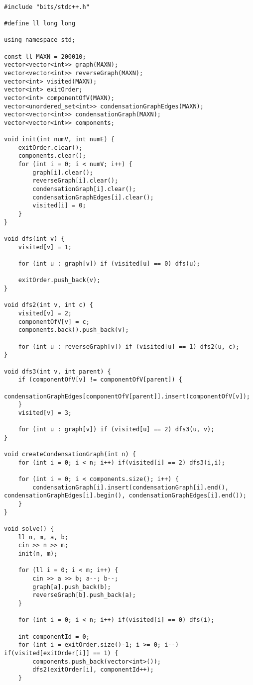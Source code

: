\documentclass[landscape,twocolumn,10pt,a4paper]{article}
\begin{document}
\begin{verbatim}

#include "bits/stdc++.h"

#define ll long long

using namespace std;

const ll MAXN = 200010;
vector<vector<int>> graph(MAXN);
vector<vector<int>> reverseGraph(MAXN);
vector<int> visited(MAXN);
vector<int> exitOrder;
vector<int> componentOfV(MAXN);
vector<unordered_set<int>> condensationGraphEdges(MAXN);
vector<vector<int>> condensationGraph(MAXN);
vector<vector<int>> components;

void init(int numV, int numE) {
    exitOrder.clear();
    components.clear();
    for (int i = 0; i < numV; i++) {
        graph[i].clear();
        reverseGraph[i].clear();
        condensationGraph[i].clear();
        condensationGraphEdges[i].clear();
        visited[i] = 0;
    }
}

void dfs(int v) {
    visited[v] = 1;

    for (int u : graph[v]) if (visited[u] == 0) dfs(u);

    exitOrder.push_back(v);
}

void dfs2(int v, int c) {
    visited[v] = 2;
    componentOfV[v] = c;
    components.back().push_back(v);

    for (int u : reverseGraph[v]) if (visited[u] == 1) dfs2(u, c);
}

void dfs3(int v, int parent) {
    if (componentOfV[v] != componentOfV[parent]) {
        condensationGraphEdges[componentOfV[parent]].insert(componentOfV[v]);
    }
    visited[v] = 3;

    for (int u : graph[v]) if (visited[u] == 2) dfs3(u, v);
}

void createCondensationGraph(int n) {
    for (int i = 0; i < n; i++) if(visited[i] == 2) dfs3(i,i);

    for (int i = 0; i < components.size(); i++) {
        condensationGraph[i].insert(condensationGraph[i].end(), condensationGraphEdges[i].begin(), condensationGraphEdges[i].end());
    }
}

void solve() {
    ll n, m, a, b;
    cin >> n >> m;
    init(n, m);

    for (ll i = 0; i < m; i++) {
        cin >> a >> b; a--; b--;
        graph[a].push_back(b);
        reverseGraph[b].push_back(a);
    }

    for (int i = 0; i < n; i++) if(visited[i] == 0) dfs(i);

    int componentId = 0;
    for (int i = exitOrder.size()-1; i >= 0; i--) if(visited[exitOrder[i]] == 1) {
        components.push_back(vector<int>());
        dfs2(exitOrder[i], componentId++);
    }


\end{verbatim}
\end{document}
